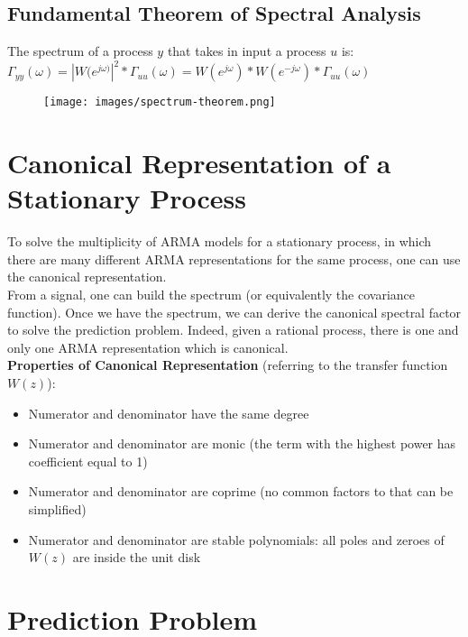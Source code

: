 \documentclass[10pt,a4paper]{article}
\begin{document}
\subsection{Fundamental Theorem of Spectral Analysis}
The spectrum of a process $y$ that takes in input a process $u$ is:
\center 
$\Gamma_{yy}(\omega)=|W(e^{j \omega)}|^2*\Gamma_{uu}(\omega)=W(e^{j\omega})*W(e^{-j\omega})*\Gamma_{uu}(\omega)$
\\
 \begin{figure}[h!]
 \hfill \texttt{[image: images/spectrum-theorem.png]}\hspace*{\fill}
  \label{fig:spectrum-theorem}
\end{figure}
\raggedright
\section{Canonical Representation of a Stationary Process}
To solve the multiplicity of ARMA models for a stationary process, in which there are many different ARMA representations for the same process, one can use the canonical representation. \\
From a signal, one can build the spectrum (or equivalently the covariance function). Once we have the spectrum, we can derive the canonical spectral factor to solve the prediction problem. Indeed, given a rational process, there is one and only one ARMA representation which is canonical. \\
\textbf{Properties of Canonical Representation} (referring to the transfer function $W(z)$):
\begin{itemize}
	\item Numerator and denominator have the same degree
	\item Numerator and denominator are monic (the term with the highest power has coefficient equal to 1)
	\item Numerator and denominator are coprime (no common factors to that can be simplified)
	\item Numerator and denominator are stable polynomials: all poles and zeroes of $W(z)$ are inside the unit disk
\end{itemize}
\section{Prediction Problem}
\end{document}
